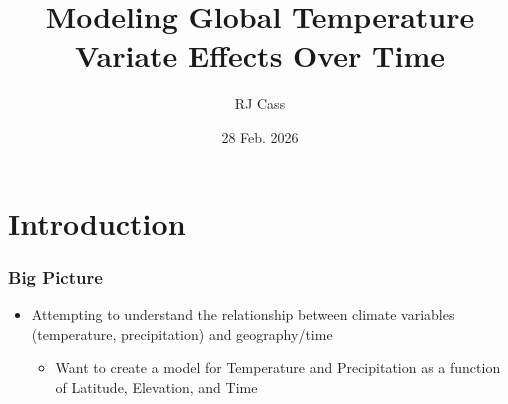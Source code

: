 \documentclass{beamer}
\title{Modeling Global Temperature Variate Effects Over Time}
\author{RJ Cass}
\institute{BYU - Student Research Conference}
\date{28 Feb. 2026}
\begin{document}
\begin{frame}
    \titlepage
\end{frame}








\section{Introduction}
    \begin{frame}
        \frametitle{Big Picture}
        \begin{itemize}
            \item Attempting to understand the relationship between climate variables (temperature, precipitation) and geography/time
            \begin{itemize}
                \item Want to create a model for Temperature and Precipitation as a function of Latitude, Elevation, and Time
            \end{itemize}
        \end{itemize} 
    \end{frame}
\end{document}
